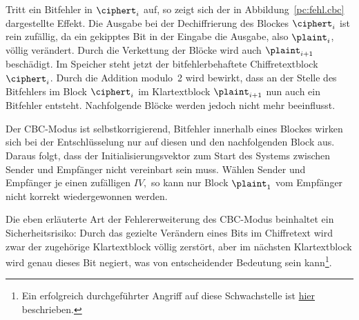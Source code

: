 Tritt ein Bitfehler in $\ciphert_i$ auf, so zeigt sich der in Abbildung~\ref{pc:fehl.cbc} dargestellte Effekt. Die Ausgabe bei der Dechiffrierung des Blockes $\ciphert_i$
ist rein zufällig, da ein gekipptes Bit in der Eingabe die Ausgabe, also $\plaint_i$, völlig verändert.
Durch die Verkettung der Blöcke wird auch $\plaint_{i+1}$ beschädigt. Im Speicher steht jetzt der bitfehlerbehaftete Chiffretextblock $\ciphert_i$.
Durch die Addition modulo~2  wird bewirkt, dass an der Stelle des Bitfehlers im Block $\ciphert_i$ im Klartextblock $\plaint_{i+1}$ nun auch ein Bitfehler entsteht. 
Nachfolgende Blöcke werden jedoch nicht mehr beeinflusst.

Der CBC-Modus ist selbstkorrigierend, Bitfehler innerhalb eines Blockes wirken sich bei der Entschlüsselung nur auf diesen und den nachfolgenden
Block aus. Daraus folgt, dass der Initialisierungsvektor zum Start des Systems zwischen Sender und Empfänger nicht vereinbart sein muss. Wählen Sender und
Empfänger je einen zufälligen $IV,$ so kann nur Block $\plaint_1$ vom Empfänger nicht korrekt wiedergewonnen werden.

Die eben erläuterte Art der Fehlererweiterung des CBC-Modus beinhaltet ein Sicherheitsrisiko: Durch das gezielte Verändern eines Bits im Chiffretext wird zwar
der zugehörige Klartextblock völlig zerstört, aber im nächsten Klartextblock wird genau dieses Bit negiert, was von entscheidender Bedeutung sein kann\footnote{Ein erfolgreich durchgeführter Angriff auf diese Schwachstelle ist  \href{http://www.jakoblell.com/blog/2013/12/22/practical-malleability-attack-against-cbc-encrypted-luks-partitions/}{hier} beschrieben.}.

